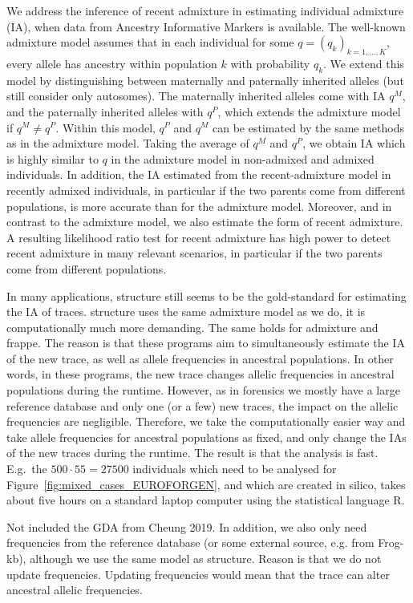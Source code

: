 \documentclass[12pt]{article}
\theoremstyle{definition}
\begin{document}
We address the inference of recent admixture in estimating individual
admixture (IA), when data from Ancestry Informative Markers is
available. The well-known admixture model assumes that in each
individual for some $q = (q_k)_{k=1,...,K}$, every allele has ancestry
within population $k$ with probability $q_k$. We extend this model by
distinguishing between maternally and paternally inherited alleles
(but still consider only autosomes). The maternally inherited alleles
come with IA $q^M$, and the paternally inherited alleles with $q^P$,
which extends the admixture model if $q^M \neq q^P$. Within this
model, $q^P$ and $q^M$ can be estimated by the same methods as in the
admixture model. Taking the average of $q^M$ and $q^P$, we obtain IA
which is highly similar to $q$ in the admixture model in non-admixed
and admixed individuals. In addition, the IA estimated from the
recent-admixture model in recently admixed individuals, in particular
if the two parents come from different populations, is more accurate
than for the admixture model. Moreover, and in contrast to the
admixture model, we also estimate the form of recent admixture. A
resulting likelihood ratio test for recent admixture has high power to
detect recent admixture in many relevant scenarios, in particular if
the two parents come from different populations.

In many applications, {\sc structure} still seems to be the
gold-standard for estimating the IA of traces. {\sc structure} uses
the same admixture model as we do, it is computationally much more
demanding. The same holds for {\sc admixture} and {\sc frappe}. The
reason is that these programs aim to simultaneously estimate the IA of
the new trace, as well as allele frequencies in ancestral
populations. In other words, in these programs, the new trace changes
allelic frequencies in ancestral populations during the
runtime. However, as in forensics we mostly have a large reference
database and only one (or a few) new traces, the impact on the allelic
frequencies are negligible. Therefore, we take the computationally
easier way and take allele frequencies for ancestral populations as
fixed, and only change the IAs of the new traces during the
runtime. The result is that the analysis is fast. E.g.\ the
$500\cdot 55 = 27500$ individuals which need to be analysed for
Figure~\ref{fig:mixed_cases_EUROFORGEN}, and which are created in
silico, takes about five hours on a standard laptop computer using the
statistical language R.



Not included the GDA from Cheung 2019. In addition, we also only need
frequencies from the reference database (or some external source,
e.g. from Frog-kb), although we use the same model as
structure. Reason is that we do not update frequencies. Updating
frequencies would mean that the trace can alter ancestral allelic
frequencies.
\end{document}
